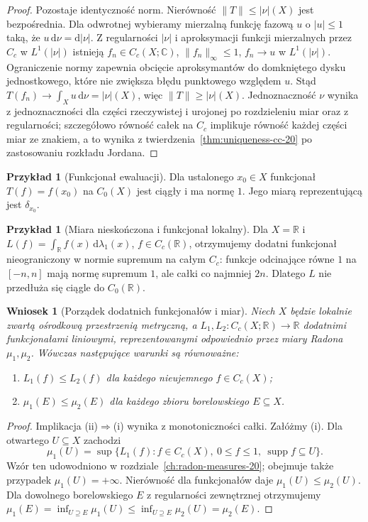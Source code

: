 \documentclass[11pt,a4paper,oneside]{book}
\numberwithin{equation}{chapter}
\theoremstyle{plain}
\newtheorem{wniosek}[twierdzenie]{Wniosek}
\theoremstyle{definition}
\newtheorem{przyklad}[twierdzenie]{Przykład}
\theoremstyle{remark}
\begin{document}
\begin{proof}
Pozostaje identyczność norm. Nierówność
$\|T\|\le|\nu|(X)$ jest bezpośrednia. Dla odwrotnej
wybieramy mierzalną funkcję fazową $u$ o $|u|\le1$
taką, że $u\,\mathrm d\nu=\mathrm d|\nu|$.
Z regularności $|\nu|$ i aproksymacji funkcji
mierzalnych przez $C_c$ w $L^1(|\nu|)$ istnieją
$f_n\in C_c(X;\mathbb C)$, $\|f_n\|_\infty\le1$,
$f_n\to u$ w $L^1(|\nu|)$. Ograniczenie normy
zapewnia obcięcie aproksymantów do domkniętego
dysku jednostkowego, które nie zwiększa błędu
punktowego względem $u$. Stąd
$T(f_n)\to\int_Xu\,\mathrm d\nu=|\nu|(X)$,
więc $\|T\|\ge|\nu|(X)$.
Jednoznaczność $\nu$ wynika z jednoznaczności dla
części rzeczywistej i urojonej po rozdzieleniu miar
oraz z regularności; szczegółowo równość całek na
$C_c$ implikuje równość każdej części miar ze znakiem,
a to wynika z twierdzenia~\ref{thm:uniqueness-cc-20}
po zastosowaniu rozkładu Jordana.
\end{proof}

\begin{przyklad}[Funkcjonał ewaluacji]
Dla ustalonego $x_0\in X$ funkcjonał $T(f)=f(x_0)$
na $C_0(X)$ jest ciągły i ma normę $1$.
Jego miarą reprezentującą jest $\delta_{x_0}$.
\end{przyklad}

\begin{przyklad}[Miara nieskończona i funkcjonał lokalny]
Dla $X=\mathbb R$ i $L(f)=\int_{\mathbb R} f(x)
\,\mathrm d\lambda_1(x)$, $f\in C_c(\mathbb R)$,
otrzymujemy dodatni funkcjonał nieograniczony w normie
supremum na całym $C_c$: funkcje odcinające równe $1$
na $[-n,n]$ mają normę supremum $1$, ale całki
co najmniej $2n$. Dlatego $L$ nie przedłuża się
ciągle do $C_0(\mathbb R)$.
\end{przyklad}

\begin{wniosek}[Porządek dodatnich funkcjonałów i miar]
\label{cor:riesz-order-21}
Niech $X$ będzie lokalnie zwartą ośrodkową przestrzenią
metryczną, a $L_1,L_2:C_c(X;\mathbb R)\to\mathbb R$
dodatnimi funkcjonałami liniowymi, reprezentowanymi
odpowiednio przez miary Radona $\mu_1,\mu_2$.
Wówczas następujące warunki są równoważne:
\begin{enumerate}[label=(\roman*)]
\item $L_1(f)\le L_2(f)$ dla każdego nieujemnego $f\in C_c(X)$;
\item $\mu_1(E)\le\mu_2(E)$ dla każdego zbioru borelowskiego
$E\subseteq X$.
\end{enumerate}
\end{wniosek}
\begin{proof}
Implikacja (ii)$\Rightarrow$(i) wynika z monotoniczności całki.
Załóżmy (i). Dla otwartego $U\subseteq X$ zachodzi
\[
 \mu_1(U)=\sup\{L_1(f):f\in C_c(X),\ 0\le f\le1,
 \ \operatorname{supp}f\subseteq U\}.
\]
Wzór ten udowodniono w rozdziale~\ref{ch:radon-measures-20};
obejmuje także przypadek $\mu_1(U)=+\infty$.
Nierówność dla funkcjonałów daje
$\mu_1(U)\le\mu_2(U)$. Dla dowolnego borelowskiego
$E$ z regularności zewnętrznej otrzymujemy
$\mu_1(E)=\inf_{U\supseteq E}\mu_1(U)
\le\inf_{U\supseteq E}\mu_2(U)=\mu_2(E)$.
\end{proof}
\end{document}
